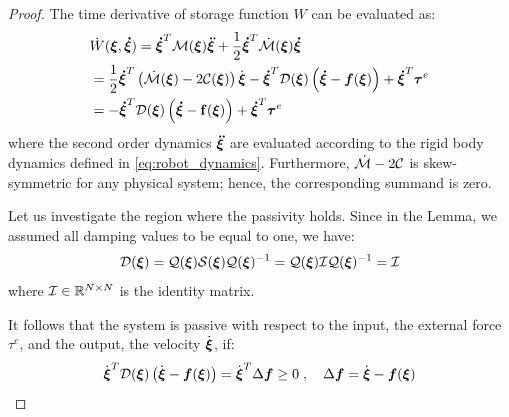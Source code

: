 \begin{proof}
The time derivative of storage function $W$ can be evaluated as:
\begin{align}
	& \dot W(\boldsymbol{\xi}, \boldsymbol{\dot \xi}) =
    \boldsymbol{\dot \xi}^T \mathcal{M}(\boldsymbol{\xi}) \boldsymbol{\ddot \xi}  + \frac{1}{2} \boldsymbol{\dot \xi}^T \dot{\mathcal{M}}(\boldsymbol{\xi}) \boldsymbol{\dot \xi}  \nonumber \\
  &= \frac{1}{2} \boldsymbol{\dot \xi}^T \left( \dot{\mathcal{M}}(\boldsymbol{\xi}) - 2 \mathcal{C}(\boldsymbol{\xi}) \right) \dot{\boldsymbol{\xi}} - \boldsymbol{\dot \xi}^T \mathcal{D}(\boldsymbol{\xi}) \left(\boldsymbol{\dot \xi} - \boldsymbol{f}(\boldsymbol{\xi}) \right) + \boldsymbol{\dot \xi}^T \boldsymbol{\tau}^e \nonumber \\
  &= - \boldsymbol{\dot \xi}^T \mathcal{D}(\boldsymbol{\xi}) \left( \boldsymbol{\dot\xi} - \mathbf{f}(\boldsymbol{\xi}) \right) + \boldsymbol{\dot\xi}^T \boldsymbol{\tau}^e
\end{align}
where the second order dynamics $\boldsymbol{\ddot \xi}$ are evaluated according to the rigid body dynamics defined in \eqref{eq:robot_dynamics}. Furthermore, $\dot{\mathcal{M}} - 2 \mathcal{C}$ is skew-symmetric for any physical system; hence, the corresponding summand is zero.

Let us investigate the region where the passivity holds. Since in the Lemma, we assumed all damping values to be equal to one, we have:
\begin{equation}
	\mathcal{D}({\boldsymbol{\xi}}) = \mathcal{Q}({\boldsymbol{\xi}}) \mathcal{S} ({\boldsymbol{\xi}}) \mathcal{Q}({\boldsymbol{\xi}})^{-1}= \mathcal{Q}({\boldsymbol{\xi}}) \mathcal{I} \mathcal{Q}({\boldsymbol{\xi}})^{-1} = \mathcal{I}
\end{equation}
where $\mathcal{I} \in \mathbb{R}^{N \times N}$ is the identity matrix.

It follows that the system is passive with respect to the input, the external force $\tau^e$, and the output, the velocity $\dot {\boldsymbol{\xi}}$, if: 
\begin{equation}
	\dot{\boldsymbol {\vecs \xi}}^T \matd{D}({\vecs \xi}) \left(\dot{\boldsymbol {\vecs \xi}} - \boldsymbol{f}(\boldsymbol {\vecs \xi}) \right) = 
    \dot{{\vecs \xi}} ^ T \Delta \vect{f}  \geq 0 
 \; , \quad
 \Delta \vect{f} = \dot{{\vecs \xi}} - \vect{f}({\vecs \xi})
 \label{eq:passivity_condition}
\end{equation}


\end{proof}
